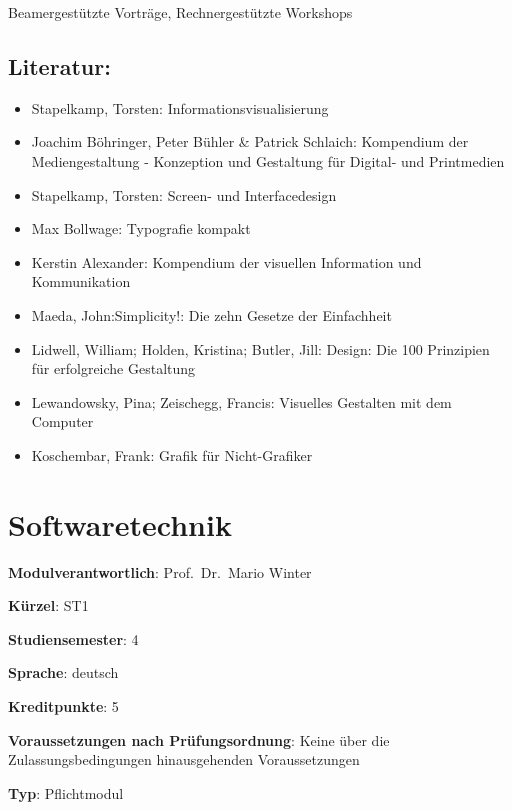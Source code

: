 Beamergestützte Vorträge, Rechnergestützte Workshops

\section*{Literatur:}\label{literatur-17}

\begin{itemize}
\tightlist
\item
  Stapelkamp, Torsten: Informationsvisualisierung
\item
  Joachim Böhringer, Peter Bühler \& Patrick Schlaich: Kompendium der
  Mediengestaltung - Konzeption und Gestaltung für Digital- und
  Printmedien
\item
  Stapelkamp, Torsten: Screen- und Interfacedesign
\item
  Max Bollwage: Typografie kompakt
\item
  Kerstin Alexander: Kompendium der visuellen Information und
  Kommunikation
\item
  Maeda, John:Simplicity!: Die zehn Gesetze der Einfachheit
\item
  Lidwell, William; Holden, Kristina; Butler, Jill: Design: Die 100
  Prinzipien für erfolgreiche Gestaltung
\item
  Lewandowsky, Pina; Zeischegg, Francis: Visuelles Gestalten mit dem
  Computer
\item
  Koschembar, Frank: Grafik für Nicht-Grafiker
\end{itemize}

\chapter{Softwaretechnik}\label{softwaretechnik}

\begin{modulHead}
\textbf{Modulverantwortlich}: Prof.~Dr.~Mario
Winter
\end{modulHead}
\begin{modulHead}
\textbf{Kürzel}:
ST1
\end{modulHead}
\begin{modulHead}
\textbf{Studiensemester}:
4
\end{modulHead}
\begin{modulHead}
\textbf{Sprache}:
deutsch
\end{modulHead}
\begin{modulHead}
\textbf{Kreditpunkte}:
5
\end{modulHead}
\begin{modulHead}
\textbf{Voraussetzungen nach
Prüfungsordnung}: Keine über die Zulassungsbedingungen hinausgehenden
Voraussetzungen
\end{modulHead}
\begin{modulHead}
\textbf{Typ}:
Pflichtmodul
\end{modulHead}


